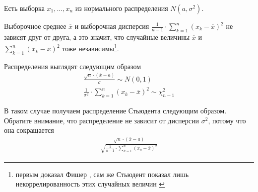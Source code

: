 \begin{example}
    Есть выборка $x_1, \dots, x_n$ из нормального распределения
    $N\left( a, \sigma^2 \right)$.

    Выборочное среднее $\overline{x}$ и выборочная дисперсия
    $\frac{1}{n-1} \cdot \sum_{k=1}^{n} \left( x_k - \overline{x} \right)^2$
    не зависят друг от друга, а это значит, что случайные величины
    $\overline{x}$ и $\sum_{k=1}^{n} \left( x_k - \overline{x} \right)^2$ тоже
    независимы\footnote{первым доказал Фишер \cite{FisherStudentApplication},
    сам же Стьюдент показал лишь некоррелированность этих случайных величин
    \cite{StudentProbableError}}.

    Распределения выглядят следующим образом
    \begin{align*}
        \frac{\sqrt{n} \cdot \left( \overline{x} - a \right)}{\sigma}
            \sim N\left( 0, 1 \right) \\
        \frac{1}{\sigma^2}
                \cdot \sum_{k=1}^{n}\left( x_k - \overline{x} \right)^2
                \sim \chi_{n-1}^2
    \end{align*}

    В таком случае получаем распределение Стьюдента следующим образом. Обратите
    внимание, что распределение не зависит от дисперсии $\sigma^2$, потому что
    она сокращается
    \begin{align*}
        \frac{\sqrt{n} \cdot \left( \overline{x} - a \right)}{
            \sqrt{\frac{1}{n-1}
                \cdot \sum_{k=1}^{n}\left( x_k - \overline{x} \right)^2}}
    \end{align*}
\end{example}
